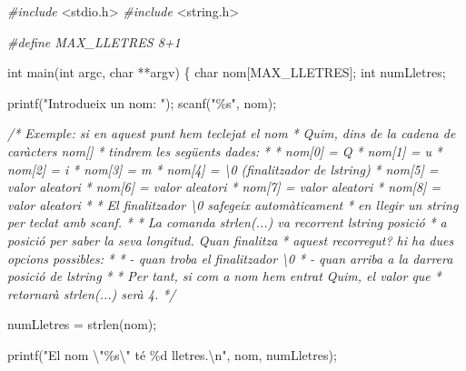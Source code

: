 \documentclass[
]{book}
\newenvironment{Shaded}{\begin{snugshade}}{\end{snugshade}}
\newcommand{\CommentTok}[1]{\textcolor[rgb]{0.56,0.35,0.01}{\textit{#1}}}
\newcommand{\DataTypeTok}[1]{\textcolor[rgb]{0.13,0.29,0.53}{#1}}
\newcommand{\ImportTok}[1]{#1}
\newcommand{\NormalTok}[1]{#1}
\newcommand{\PreprocessorTok}[1]{\textcolor[rgb]{0.56,0.35,0.01}{\textit{#1}}}
\newcommand{\SpecialCharTok}[1]{\textcolor[rgb]{0.00,0.00,0.00}{#1}}
\newcommand{\StringTok}[1]{\textcolor[rgb]{0.31,0.60,0.02}{#1}}
\begin{document}
\begin{Shaded}
\begin{Highlighting}[]
\PreprocessorTok{\#include }\ImportTok{\textless{}stdio.h\textgreater{}}
\PreprocessorTok{\#include }\ImportTok{\textless{}string.h\textgreater{}}

\PreprocessorTok{\#define MAX\_LLETRES 8+1}

\DataTypeTok{int}\NormalTok{ main(}\DataTypeTok{int}\NormalTok{ argc, }\DataTypeTok{char}\NormalTok{ **argv) \{}
    \DataTypeTok{char}\NormalTok{ nom[MAX\_LLETRES];}
    \DataTypeTok{int}\NormalTok{ numLletres;}

\NormalTok{    printf(}\StringTok{"Introdueix un nom: "}\NormalTok{);}
\NormalTok{    scanf(}\StringTok{"\%s"}\NormalTok{, nom);}

    \CommentTok{/* Exemple: si en aquest punt hem teclejat el nom}
\CommentTok{     * Quim, dins de la cadena de caràcters nom[]}
\CommentTok{     * tindrem les següents dades:}
\CommentTok{     *}
\CommentTok{     * nom[0] = \textquotesingle{}Q\textquotesingle{}}
\CommentTok{     * nom[1] = \textquotesingle{}u\textquotesingle{}}
\CommentTok{     * nom[2] = \textquotesingle{}i\textquotesingle{}}
\CommentTok{     * nom[3] = \textquotesingle{}m\textquotesingle{}}
\CommentTok{     * nom[4] = \textquotesingle{}\textbackslash{}0\textquotesingle{} (finalitzador de l\textquotesingle{}string)}
\CommentTok{     * nom[5] = valor aleatori}
\CommentTok{     * nom[6] = valor aleatori}
\CommentTok{     * nom[7] = valor aleatori}
\CommentTok{     * nom[8] = valor aleatori}
\CommentTok{     *}
\CommentTok{     * El finalitzador \textquotesingle{}\textbackslash{}0\textquotesingle{} s\textquotesingle{}afegeix automàticament}
\CommentTok{     * en llegir un string per teclat amb scanf.}
\CommentTok{     * }
\CommentTok{     * La comanda strlen(...) va recorrent l\textquotesingle{}string posició}
\CommentTok{     * a posició per saber la seva longitud. Quan finalitza}
\CommentTok{     * aquest recorregut? hi ha dues opcions possibles:}
\CommentTok{     *}
\CommentTok{     * {-} quan troba el finalitzador \textquotesingle{}\textbackslash{}0\textquotesingle{}}
\CommentTok{     * {-} quan arriba a la darrera posició de l\textquotesingle{}string}
\CommentTok{     *}
\CommentTok{     * Per tant, si com a nom hem entrat Quim, el valor que }
\CommentTok{     * retornarà strlen(...) serà 4.}
\CommentTok{     */}

\NormalTok{    numLletres = strlen(nom);}

\NormalTok{    printf(}\StringTok{"El nom }\SpecialCharTok{\textbackslash{}"}\StringTok{\%s}\SpecialCharTok{\textbackslash{}"}\StringTok{ té \%d lletres.}\SpecialCharTok{\textbackslash{}n}\StringTok{"}\NormalTok{, nom, numLletres);}


\end{Highlighting}
\end{Shaded}
\end{document}
